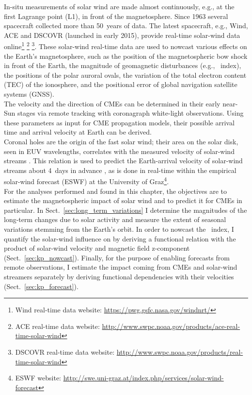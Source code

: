 In-situ measurements of solar wind are made almost continuously, e.g., at the first Lagrange point (L1), in front of the magnetosphere. Since 1963 several spacecraft collected more than 50~years of data. The latest spacecraft, e.g., Wind, ACE and DSCOVR (launched in early 2015), provide real-time solar-wind data online\footnote{Wind real-time data website: \url{https://pwg.gsfc.nasa.gov/windnrt/}} \footnote{ACE real-time data website: \url{http://www.swpc.noaa.gov/products/ace-real-time-solar-wind}} \footnote{DSCOVR real-time data website: \url{http://www.swpc.noaa.gov/products/real-time-solar-wind}}.
These solar-wind real-time data are used to nowcast various effects on the Earth's magnetosphere, such as the position of the magnetospheric bow shock in front of the Earth, the magnitude of geomagnetic disturbances (e.g., \Kp~index), the positions of the polar auroral ovals, the variation of the total electron content (TEC) of the ionosphere, and the positional error of global navigation satellite systems (GNSS).\\


The velocity and the direction of CMEs can be determined in their early near-Sun stages via remote tracking with coronagraph white-light observations. Using these parameters as input for CME propagation models, their possible arrival time and arrival velocity at Earth can be derived.\\

Coronal holes are the origin of the fast solar wind; their area on the solar disk, seen in EUV wavelengths, correlates with the measured velocity of solar-wind streams \citep{Vrsnak2007}. This relation is used to predict the Earth-arrival velocity of solar-wind streams about 4~days in advance \citep{Rotter2012}, as is done in real-time within the empirical solar-wind forecast (ESWF) at the University of Graz\footnote{ESWF website: \url{http://swe.uni-graz.at/index.php/services/solar-wind-forecast}}.\\

For the analyses performed and found in this chapter, the objectives are to estimate the magnetospheric impact of solar wind and to predict it for CMEs in particular. In Sect.~\ref{sec:long_term_variations} I determine the magnitudes of the long-term \Kp{} changes due to solar activity and measure the extent of seasonal variations stemming from the Earth's orbit. In order to nowcast the \Kp{}~index, I quantify the solar-wind influence on \Kp{} by deriving a functional relation with the product of solar-wind velocity and magnetic field z-component (Sect.~\ref{sec:kp_nowcast}). Finally, for the purpose of enabling \Kp{} forecasts from remote observations, I estimate the \Kp{} impact coming from CMEs and solar-wind streamers separately by deriving functional dependencies with their velocities (Sect.~\ref{sec:kp_forecast}).


